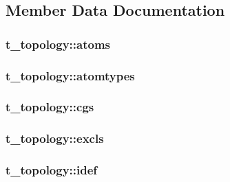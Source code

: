 \subsection{\-Member \-Data \-Documentation}
\hypertarget{structt__topology_a376c1563a76aeb4fb3452a1465cd191a}{
\subsubsection[{atoms}]{ {\bf t\-\_\-topology\-::atoms}}}\label{structt__topology_a376c1563a76aeb4fb3452a1465cd191a}
\hypertarget{structt__topology_a5dfd8db276bf3218b8224cf62febd7d5}{
\subsubsection[{atomtypes}]{ {\bf t\-\_\-topology\-::atomtypes}}}\label{structt__topology_a5dfd8db276bf3218b8224cf62febd7d5}
\hypertarget{structt__topology_a284bc1dc654ccd4c754105c1027b8c3f}{
\subsubsection[{cgs}]{ {\bf t\-\_\-topology\-::cgs}}}\label{structt__topology_a284bc1dc654ccd4c754105c1027b8c3f}
\hypertarget{structt__topology_a1ed3794ea0cd8d10ebfef698398c5d02}{
\subsubsection[{excls}]{ {\bf t\-\_\-topology\-::excls}}}\label{structt__topology_a1ed3794ea0cd8d10ebfef698398c5d02}
\hypertarget{structt__topology_a3e64be755402f5e7f1db6de15ab1555a}{
\subsubsection[{idef}]{ {\bf t\-\_\-topology\-::idef}}}\label{structt__topology_a3e64be755402f5e7f1db6de15ab1555a}
